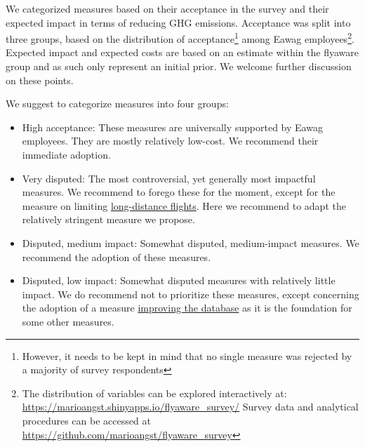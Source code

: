 \documentclass[]{tufte-handout}
\providecommand{\tightlist}{%
  \setlength{\itemsep}{0pt}\setlength{\parskip}{0pt}}
\begin{document}
We categorized measures based on their acceptance in the survey and
their expected impact in terms of reducing GHG emissions. Acceptance was
split into three groups, based on the distribution of
acceptance\footnote{However, it needs to be kept in mind that no single
  measure was rejected by a majority of survey respondents} among Eawag
employees\footnote{The distribution of variables can be explored
  interactively at:
  \url{https://marioangst.shinyapps.io/flyaware_survey/} Survey data and
  analytical procedures can be accessed at
  \url{https://github.com/marioangst/flyaware_survey}}. Expected impact
and expected costs are based on an estimate within the flyaware group
and as such only represent an initial prior. We welcome further
discussion on these points.

We suggest to categorize measures into four groups:

\begin{itemize}
\tightlist
\item
  High acceptance: These measures are universally supported by Eawag
  employees. They are mostly relatively low-cost. We recommend their
  immediate adoption.
\item
  Very disputed: The most controversial, yet generally most impactful
  measures. We recommend to forego these for the moment, except for the
  measure on limiting
  \protect\hyperlink{overseas_restriction}{long-distance flights}. Here
  we recommend to adapt the relatively stringent measure we propose.
\item
  Disputed, medium impact: Somewhat disputed, medium-impact measures. We
  recommend the adoption of these measures.
\item
  Disputed, low impact: Somewhat disputed measures with relatively
  little impact. We do recommend not to prioritize these measures,
  except concerning the adoption of a measure
  \protect\hyperlink{database}{improving the database} as it is the
  foundation for some other measures.
\end{itemize}
\end{document}
